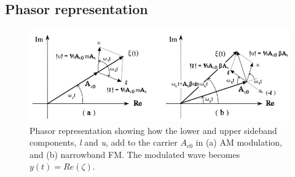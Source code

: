 \subsection{Phasor representation}

\begin{figure} [H]
	\centering
	\includegraphics[width=\linewidth]{graphics/9.png}
	\caption{Phasor representation showing how the lower and upper sideband components, \textit{l}	and \textit{u}, add to the carrier $A_{c0}$ in (a) AM modulation, and (b) narrowband FM. The modulated wave becomes $y(t)=Re(\zeta)$.}
	\label{fig:9}
\end{figure}
